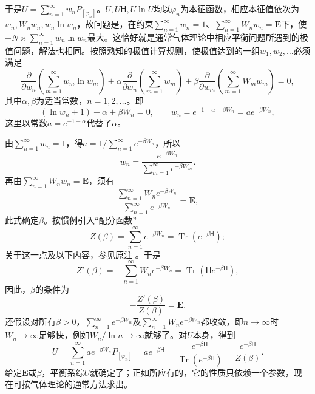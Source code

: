 \documentclass[fontsize=13pt,twoside,openany,headings=normal,parskip=false,bookmarkpackage=false,DIV=calc]{scrbook}
\begin{document}
于是$U=\sum_{n=1}^{\infty}w_nP_{[\varphi_n]}$。$U,\allowbreak U\mathsf{H},\allowbreak U\ln U$均以$\varphi_n$为本征函数，相应本征值依次为$w_n,\allowbreak W_nw_n,\allowbreak w_n\ln w_n$，故问题是，在约束$\sum_{n=1}^{\infty}w_n=1$、$\sum_{n=1}^{\infty}W_nw_n=\mathbf E$下，使$-N\varkappa\sum_{n=1}^{\infty}w_n\ln w_n$最大。这恰好就是通常气体理论中相应平衡问题所遇到的极值问题，解法也相同。按照熟知的极值计算规则，使极值达到的一组$w_1,\allowbreak w_2,\allowbreak \ldots$必须满足
\[
\frac{\partial}{\partial w_n}\left(\sum_{m=1}^{\infty}w_m\ln w_m\right)
+\alpha\frac{\partial}{\partial w_n}\left(\sum_{m=1}^{\infty}w_m\right)
+\beta\frac{\partial}{\partial w_m}\left(\sum_{m=1}^{\infty}W_mw_m\right)=0,
\]
其中$\alpha,\allowbreak \beta$为适当常数，$n=1,\allowbreak 2,\allowbreak \ldots$。即
\[
(\ln w_n+1)+\alpha+\beta W_n=0,\qquad
w_n=e^{-1-\alpha-\beta W_n}=ae^{-\beta W_n},
\]
这里以常数$a=e^{-1-\alpha}$代替了$\alpha$。

\hypertarget{origpage-209}{}\label{origpage-209}由$\sum_{n=1}^{\infty}w_n=1$，得$a=1/\sum_{n=1}^{\infty}e^{-\beta W_n}$，所以
\[
w_n=\frac{e^{-\beta W_n}}{\sum_{m=1}^{\infty}e^{-\beta W_m}}.
\]
再由$\sum_{n=1}^{\infty}W_nw_n=\mathbf E$，须有
\[
\frac{\sum_{n=1}^{\infty}W_ne^{-\beta W_n}}{\sum_{n=1}^{\infty}e^{-\beta W_n}}=\mathbf E,
\]
此式确定$\beta$。按惯例引入“配分函数”
\[
Z(\beta)=\sum_{n=1}^{\infty}e^{-\beta W_n}=\operatorname{Tr}(e^{-\beta \mathsf{H}});
\]
关于这一点及以下内容，参见原注 \hyperlink{note-197}{}。于是
\[
Z'(\beta)=-\sum_{n=1}^{\infty}W_ne^{-\beta W_n}=\operatorname{Tr}(\mathsf{H}e^{-\beta \mathsf{H}}),
\]
因此，$\beta$的条件为
\[
-\frac{Z'(\beta)}{Z(\beta)}=\mathbf E.
\]
还假设对所有$\beta>0$，$\sum_{n=1}^{\infty}e^{-\beta W_n}$及$\sum_{n=1}^{\infty}W_ne^{-\beta W_n}$都收敛，即$n\to\infty$时$W_n\to\infty$足够快，例如$W_n/\ln n\to\infty$就够了。对$U$本身，得到
\[
U=\sum_{n=1}^{\infty}ae^{-\beta W_n}P_{[\varphi_n]}
=ae^{-\beta \mathsf{H}}=\frac{e^{-\beta \mathsf{H}}}{\operatorname{Tr}(e^{-\beta \mathsf{H}})}
=\frac{e^{-\beta \mathsf{H}}}{Z(\beta)}.
\]
给定$\mathbf E$或$\beta$，平衡系综$U$就确定了；正如所应有的，它的性质只依赖一个参数，现在可按气体理论的通常方法求出。
\end{document}
